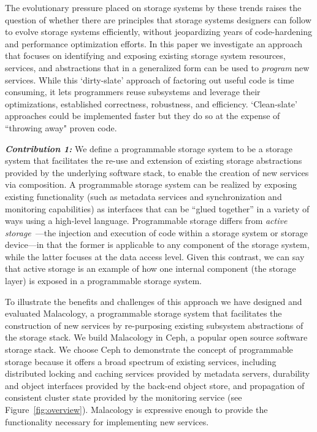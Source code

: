 The evolutionary pressure placed on storage systems by these trends raises the
question of whether there are principles that storage systems designers can
follow to evolve storage systems efficiently, without jeopardizing years of
code-hardening and performance optimization efforts.  In this paper we
investigate an approach that focuses on identifying and exposing existing
storage system resources, services, and abstractions that in a generalized form
can be used to \emph{program} new services. While this `dirty-slate' approach
of factoring out useful code is time consuming, it lets programmers reuse
subsystems and leverage their optimizations, established correctness,
robustness, and efficiency. `Clean-slate' approaches could be implemented
faster but they do so at the expense of ``throwing away" proven code.

{\it \textbf{Contribution 1:}} We define a programmable storage system to be a
storage system that facilitates the re-use and extension of existing storage
abstractions provided by the underlying software stack, to enable the creation
of new services via composition.  A programmable storage system can be realized
by exposing existing functionality (such as  metadata services and synchronization and monitoring capabilities) as
interfaces that can be ``glued together'' in a variety of ways using a
high-level language. Programmable storage differs from \emph{active
storage}~\cite{riedel:vldb98}---the injection and execution of code within a
storage system or storage device---in that the former is applicable to any
component of the storage system, while the latter focuses at the data access
level. Given this contrast, we can say that active storage is an example of how
one internal component (the storage layer) is exposed in a programmable storage
system.  

To illustrate the benefits and challenges of this approach we have designed and
evaluated Malacology, a programmable storage system that facilitates the
construction of new services by re-purposing existing subsystem abstractions of
the storage stack.  We build Malacology in Ceph, a popular open source software
storage stack.  We choose Ceph to demonstrate the concept of programmable
storage because it offers a broad spectrum of existing services, including
distributed locking and caching services provided by  metadata servers, durability and object interfaces provided by the
back-end object store, and propagation of consistent cluster state provided by
the monitoring service (see Figure~\ref{fig:overview}).  Malacology is
expressive enough to provide the functionality necessary for implementing new
services.  


